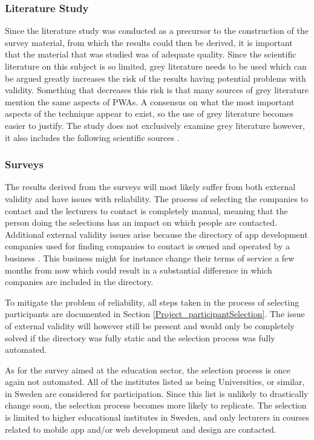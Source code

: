 \documentclass[a4paper,12pt]{article}
\begin{document}
\subsubsection{Literature Study}
\label{Method_reliabilityValidity_study}
Since the literature study was conducted as a precursor to the construction of the survey material, from which the results could then be derived, it is important that the material that was studied was of adequate quality. Since the scientific literature on this subject is so limited, grey literature needs to be used which can be argued greatly increases the risk of the results having potential problems with validity. Something that decreases this risk is that many sources of grey literature mention the same aspects of PWAs. A consensus on what the most important aspects of the technique appear to exist, so the use of grey literature becomes easier to justify. The study does not exclusively examine grey literature however, it also includes the following scientific sources \cite{dawning_of_pwa, pwa_in_modern_webdeb, pwa_unified}.

\subsubsection{Surveys}
\label{Method_reliabilityValidity_surveys}
The results derived from the surveys will most likely suffer from both external validity and have issues with reliability. The process of selecting the companies to contact and the lecturers to contact is completely manual, meaning that the person doing the selections has an impact on which people are contacted. Additional external validity issues arise because the directory of app development companies used for finding companies to contact is owned and operated by a business \cite{clutch}. This business might for instance change their terms of service a few months from now which could result in a substantial difference in which companies are included in the directory.

To mitigate the problem of reliability, all steps taken in the process of selecting participants are documented in Section \ref{Project_participantSelection}. The issue of external validity will however still be present and would only be completely solved if the directory was fully static and the selection process was fully automated.

As for the survey aimed at the education sector, the selection process is once again not automated. All of the institutes listed as being Universities, or similar, in Sweden are considered for participation. Since this list is unlikely to drastically change soon, the selection process becomes more likely to replicate. The selection is limited to higher educational institutes in Sweden, and only lecturers in courses related to mobile app and/or web development and design are contacted.
\end{document}
